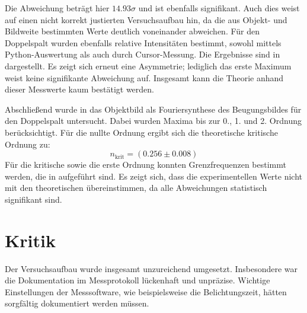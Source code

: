 Die Abweichung beträgt hier $14.93\sigma$ und ist ebenfalls signifikant. Auch dies weist auf einen nicht korrekt justierten Versuchsaufbau hin, da die aus Objekt- und Bildweite bestimmten Werte deutlich voneinander abweichen.
Für den Doppelspalt wurden ebenfalls relative Intensitäten bestimmt, sowohl mittels Python-Auswertung als auch durch Cursor-Messung. Die Ergebnisse sind in  dargestellt. Es zeigt sich erneut eine Asymmetrie; lediglich das erste Maximum weist keine signifikante Abweichung auf. Insgesamt kann die Theorie anhand dieser Messwerte kaum bestätigt werden.

Abschließend wurde in  das Objektbild als Fouriersynthese des Beugungsbildes für den Doppelspalt untersucht. Dabei wurden Maxima bis zur 0., 1. und 2. Ordnung berücksichtigt. Für die nullte Ordnung ergibt sich die theoretische kritische Ordnung zu:
\[
    n_\text{krit} = (0.256 \pm 0.008)
\]
Für die kritische sowie die erste Ordnung konnten Grenzfrequenzen bestimmt werden, die in  aufgeführt sind. Es zeigt sich, dass die experimentellen Werte nicht mit den theoretischen übereinstimmen, da alle Abweichungen statistisch signifikant sind.

\section{Kritik}

Der Versuchsaufbau wurde insgesamt unzureichend umgesetzt. Insbesondere war die Dokumentation im Messprotokoll lückenhaft und unpräzise. Wichtige Einstellungen der Messsoftware, wie beispielsweise die Belichtungszeit, hätten sorgfältig dokumentiert werden müssen.
